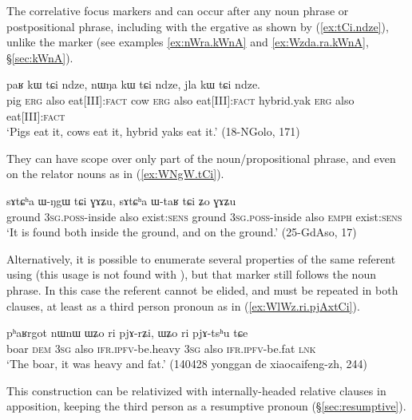 The correlative focus markers  and  can occur after any noun phrase or postpositional phrase, including with the ergative   as shown by (\ref{ex:tCi.ndze}), unlike the marker  (see examples \ref{ex:nWra.kWnA} and \ref{ex:Wzda.ra.kWnA}, §\ref{sec:kWnA}).
  
  \begin{exe}
\ex \label{ex:tCi.ndze}
 \gll paʁ kɯ tɕi ndze, nɯŋa kɯ tɕi ndze, jla kɯ tɕi ndze.   \\
 pig \textsc{erg} also eat[III]:\textsc{fact}  cow \textsc{erg} also eat[III]:\textsc{fact}  hybrid.yak \textsc{erg} also eat[III]:\textsc{fact}  \\
 \glt `Pigs eat it, cows eat it, hybrid yaks eat it.' (18-NGolo, 171)
  \end{exe}

They can have scope over only part of the noun/propositional phrase, and even on the relator nouns as in (\ref{ex:WNgW.tCi}).

   \begin{exe}
\ex \label{ex:WNgW.tCi}
 \gll   sɤtɕʰa ɯ-ŋgɯ tɕi ɣɤʑu, sɤtɕʰa ɯ-taʁ tɕi ʑo ɣɤʑu \\
 ground \textsc{3sg}.\textsc{poss}-inside also exist:\textsc{sens}  ground \textsc{3sg}.\textsc{poss}-inside also \textsc{emph} exist:\textsc{sens} \\
 \glt `It is found both inside the ground, and on the ground.' (25-GdAso, 17)
    \end{exe}
    
Alternatively, it is possible to enumerate several properties of the same referent using  (this usage is not found with ), but that marker still follows the noun phrase. In this case the referent cannot be elided, and must be repeated in both clauses, at least as a third person pronoun  as in (\ref{ex:WlWz.ri.pjAxtCi}). 

  \begin{exe}
\ex \label{ex:WlWz.ri.pjArZi}
 \gll pʰaʁrgot nɯnɯ ɯʑo ri pjɤ-rʑi, ɯʑo ri pjɤ-tsʰu tɕe \\
 boar \textsc{dem} \textsc{3sg} also \textsc{ifr}.\textsc{ipfv}-be.heavy \textsc{3sg} also \textsc{ifr}.\textsc{ipfv}-be.fat \textsc{lnk} \\ 
\glt  `The boar, it was heavy and fat.' (140428 yonggan de xiaocaifeng-zh, 244)
 \end{exe}

This construction can be relativized with internally-headed relative clauses in apposition, keeping the third person  as a resumptive pronoun (§\ref{sec:resumptive}).

